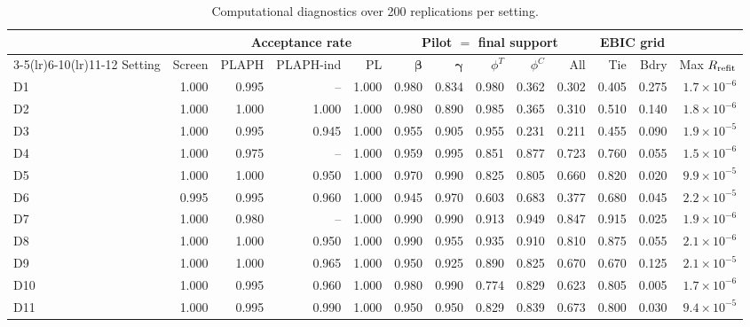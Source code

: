 
\begin{table}[!htbp]
\centering
\caption{Computational diagnostics over 200 replications per setting.}
\label{tab:supp-diagnostics}
\begin{threeparttable}
\scriptsize
\setlength{\tabcolsep}{3.2pt}
\begin{tabular}{lrrrrrrrrrrrr}
\toprule
& & \multicolumn{3}{c}{Acceptance rate} & \multicolumn{5}{c}{Pilot $=$ final support} & \multicolumn{2}{c}{EBIC grid} & \\
\cmidrule(lr){3-5}\cmidrule(lr){6-10}\cmidrule(lr){11-12}
Setting & Screen & PLAPH & PLAPH-ind & PL & $\boldsymbol\beta$ & $\boldsymbol\gamma$ & $\phi^T$ & $\phi^C$ & All & Tie & Bdry & Max $R_{\rm refit}$ \\
\midrule
D1 & 1.000 & 0.995 & -- & 1.000 & 0.980 & 0.834 & 0.980 & 0.362 & 0.302 & 0.405 & 0.275 & $1.7\times10^{-6}$ \\
D2 & 1.000 & 1.000 & 1.000 & 1.000 & 0.980 & 0.890 & 0.985 & 0.365 & 0.310 & 0.510 & 0.140 & $1.8\times10^{-6}$ \\
D3 & 1.000 & 0.995 & 0.945 & 1.000 & 0.955 & 0.905 & 0.955 & 0.231 & 0.211 & 0.455 & 0.090 & $1.9\times10^{-5}$ \\
D4 & 1.000 & 0.975 & -- & 1.000 & 0.959 & 0.995 & 0.851 & 0.877 & 0.723 & 0.760 & 0.055 & $1.5\times10^{-6}$ \\
D5 & 1.000 & 1.000 & 0.950 & 1.000 & 0.970 & 0.990 & 0.825 & 0.805 & 0.660 & 0.820 & 0.020 & $9.9\times10^{-5}$ \\
D6 & 0.995 & 0.995 & 0.960 & 1.000 & 0.945 & 0.970 & 0.603 & 0.683 & 0.377 & 0.680 & 0.045 & $2.2\times10^{-5}$ \\
D7 & 1.000 & 0.980 & -- & 1.000 & 0.990 & 0.990 & 0.913 & 0.949 & 0.847 & 0.915 & 0.025 & $1.9\times10^{-6}$ \\
D8 & 1.000 & 1.000 & 0.950 & 1.000 & 0.990 & 0.955 & 0.935 & 0.910 & 0.810 & 0.875 & 0.055 & $2.1\times10^{-6}$ \\
D9 & 1.000 & 1.000 & 0.965 & 1.000 & 0.950 & 0.925 & 0.890 & 0.825 & 0.670 & 0.670 & 0.125 & $2.1\times10^{-5}$ \\
D10 & 1.000 & 0.995 & 0.960 & 1.000 & 0.980 & 0.990 & 0.774 & 0.829 & 0.623 & 0.805 & 0.005 & $1.7\times10^{-6}$ \\
D11 & 1.000 & 0.995 & 0.990 & 1.000 & 0.950 & 0.950 & 0.829 & 0.839 & 0.673 & 0.800 & 0.030 & $9.4\times10^{-5}$ \\

\end{tabular}
\end{threeparttable}
\end{table}
